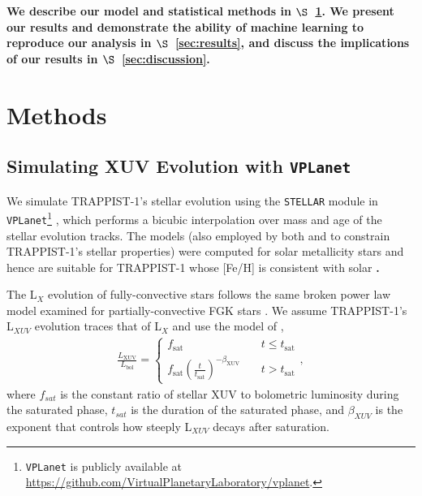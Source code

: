 \documentclass[twocolumn]{aastex62}
\newcommand{\xxx}[1]{{\textbf{#1}}}
\newcommand{\vplanet}[0]{\texttt{VPLanet}\xspace}
\newcommand{\stellar}[0]{\texttt{STELLAR}\xspace}
\begin{document}
\xxx{We describe our model and statistical methods in $\S$~\ref{sec:methods}. We present our results and demonstrate the ability of machine learning to reproduce our analysis in $\S$~\ref{sec:results}, and discuss the implications of our results in $\S$~\ref{sec:discussion}.}

\section{Methods} \label{sec:methods}

\subsection{Simulating XUV Evolution with \vplanet} \label{sec:model}

We simulate TRAPPIST-1's stellar evolution using the \stellar module in \vplanet\footnote{\vplanet is publicly available at \href{https://github.com/VirtualPlanetaryLaboratory/vplanet}{https://github.com/VirtualPlanetaryLaboratory/vplanet}.} \citep{Barnes2019}, which performs a bicubic interpolation over mass and age of the \citet{Baraffe2015} stellar evolution tracks. The \citet{Baraffe2015} models (also employed by both \citet{Burgasser2017} and \citet{vanGrootel2018} to constrain TRAPPIST-1's stellar properties) were computed for solar metallicity stars and hence are suitable for TRAPPIST-1 whose [Fe/H] is consistent with solar \xxx{\citep[][see also \citet{Burgasser2017}]{Gillon2016}.}

The L$_{X}$ evolution of fully-convective stars follows the same broken power law model examined for partially-convective FGK stars \citep{Wright2016,Wright2018}. We assume TRAPPIST-1's L$_{XUV}$ evolution traces that of L$_{X}$ and use the model of \citet{Ribas2005},
\begin{align}
\label{eqn:lxuv}
\frac{L_\mathrm{XUV}}{L_\mathrm{bol}} = \left\{
				\begin{array}{lcr}
					f_\mathrm{sat} &\ & t \leq t_\mathrm{sat} \\
					f_\mathrm{sat}\left(\frac{t}{t_\mathrm{sat}}\right)^{-\beta_\mathrm{XUV}} &\ & t > t_\mathrm{sat}
				\end{array}
				\right.,
\end{align}
where $f_{sat}$ is the constant ratio of stellar XUV to bolometric luminosity during the saturated phase, $t_{sat}$ is the duration of the saturated phase, and $\beta_{XUV}$ is the exponent that controls how steeply L$_{XUV}$ decays after saturation. 
\end{document}

